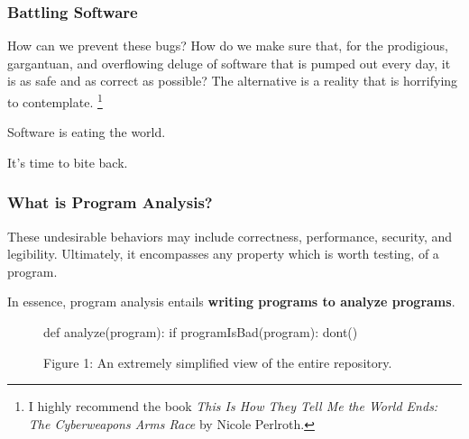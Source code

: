 \documentclass[aspectratio=169, handout]{beamer}
\begin{document}
\begin{frame}[fragile]
  \frametitle{Battling Software}

  How can we prevent these bugs? How do we make sure that,
  for the prodigious, gargantuan, and overflowing deluge of software
  that is pumped out every day, it is as safe and as correct as possible?
  The alternative is a reality that is horrifying to contemplate.
  \footnote{I highly recommend the book \textit{This Is How They Tell Me
  the World Ends: The Cyberweapons Arms Race} by Nicole Perlroth.}

  \pause
  \vspace{\fill}

  Software is eating the world.

  \pause
  \vspace{\fill}

  It's time to bite back.
\end{frame}


\begin{frame}[fragile]
  \frametitle{What is Program Analysis?}


  \pause
  \vspace{\fill}

  These undesirable behaviors may include correctness, performance,
  security, and legibility. Ultimately, it encompasses any property
  which is worth testing, of a program.

  \pause
  \vspace{\fill}

  In essence, program analysis entails \textbf{writing programs to
  analyze programs}.

  \pause
  \vspace{\fill}

  \begin{figure}
  \begin{codeblock}[language=python]
    def analyze(program):
      if programIsBad(program):
        dont()
  \end{codeblock}
    \caption{Figure 1: An extremely simplified view of the entire  repository.}
  \end{figure}
\end{frame}

\end{document}
